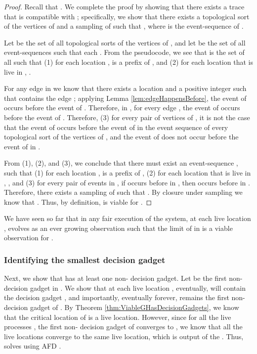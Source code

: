 \documentclass[11pt]{article}
\numberwithin{theorem}{section}
\begin{document}
\begin{proof}
Recall that . We complete the proof by showing that there exists a trace  that is compatible with ; specifically, we show that there exists a topological sort  of the vertices of  and a sampling  of  such that , where  is the event-sequence of .

Let  be the set of all topological sorts of the vertices of , and let  be the set of all event-sequences such that each . From the pseudocode, we see that  is the set of all  such that (1) for each location ,  is a prefix of , and (2) for each location  that is live in , .

For any edge  in  we know that there exists a location  and a positive integer  such that  contains the edge ; applying Lemma \ref{lem:edgeHappensBefore}, the event of  occurs before the event of
. Therefore, in , for every edge , the event
of  occurs before the event of . Therefore, (3) for every pair of vertices  of , it is not the case that the event of  occurs before the event of  in the event sequence  of every topological sort  of the vertices of , and the event of  does not occur before the event of  in .

From (1), (2), and (3), we conclude that there must exist an event-sequence , such that (1) for each location ,  is a prefix of , (2) for each location  that is live in , , and (3) for every pair of events  in , if  occurs before  in , then  occurs before  in . Therefore, there exists a sampling  of  such that  .
By closure under sampling we know that . 
Thus, by definition,  is viable for .
\end{proof}



We have seen so far that in any fair execution  of the system, at
each live location ,  evolves as an ever growing observation such that
the limit  of  in  is a viable observation for . 




\subsubsection{Identifying the smallest decision gadget}\label{subsubsec:proofSmallestDecisionGadget}
Next, we show that  has at least one non- decision gadget. Let  be the first non- decision gadget in . We show that at
each live location , eventually,  will contain the decision gadget , and importantly, eventually forever,  remains the first non- decision gadget of . By Theorem \ref{thm:ViableGHasDecisionGadgets}, we know that the critical location of  is a live location. However, since for all the live processes , the first non- decision gadget of  converges to , we know that all the live locations converge to the same live location, which is output of the . Thus,  solves  using AFD .
\end{document}
